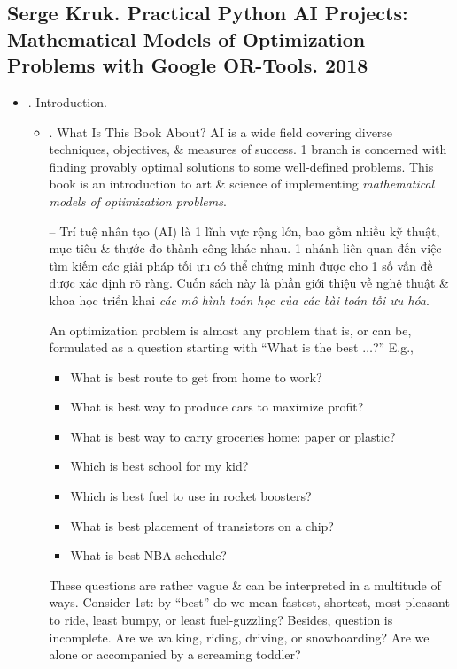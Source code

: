 \documentclass{article}
\begin{document}

\subsection{{\sc Serge Kruk}. Practical Python AI Projects: Mathematical Models of Optimization Problems with Google OR-Tools. 2018}

\begin{itemize}
    \item {. Introduction.}
    \begin{itemize}
        \item {. What Is This Book About?} AI is a wide field covering diverse techniques, objectives, \& measures of success. 1 branch is concerned with finding provably optimal solutions to some well-defined problems. This book is an introduction to art \& science of implementing {\it mathematical models of optimization problems}.

        -- Trí tuệ nhân tạo (AI) là 1 lĩnh vực rộng lớn, bao gồm nhiều kỹ thuật, mục tiêu \& thước đo thành công khác nhau. 1 nhánh liên quan đến việc tìm kiếm các giải pháp tối ưu có thể chứng minh được cho 1 số vấn đề được xác định rõ ràng. Cuốn sách này là phần giới thiệu về nghệ thuật \& khoa học triển khai {\it các mô hình toán học của các bài toán tối ưu hóa}.

        An optimization problem is almost any problem that is, or can be, formulated as a question starting with ``What is the best $\ldots$?'' E.g.,
        \begin{itemize}
            \item What is best route to get from home to work?
            \item What is best way to produce cars to maximize profit?
            \item What is best way to carry groceries home: paper or plastic?
            \item Which is best school for my kid?
            \item Which is best fuel to use in rocket boosters?
            \item What is best placement of transistors on a chip?
            \item What is best NBA schedule?
        \end{itemize}
        These questions are rather vague \& can be interpreted in a multitude of ways. Consider 1st: by ``best'' do we mean fastest, shortest, most pleasant to ride, least bumpy, or least fuel-guzzling? Besides, question is incomplete. Are we walking, riding, driving, or snowboarding? Are we alone or accompanied by a screaming toddler?


\end{itemize}
\end{itemize}
\end{document}
